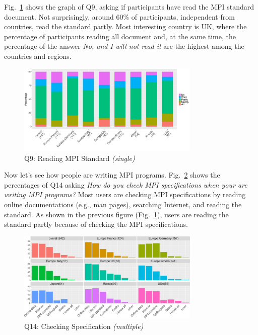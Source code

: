 \documentclass[preprint,5p,times]{elsarticle}
\def\myquote#1{{\it #1}}
\begin{document}
Fig.~\ref{fig:reading-standard} shows the graph of Q9, asking if
participants have read the MPI standard document. Not surprisingly,
around 60\% of participants, independent from countries, read the
standard partly. Most interesting country is UK, where the percentage
of participants reading all document and, at the same time, the
percentage of the answer \myquote{No, and I will not read it} are the
highest among the countries and regions.

\begin{figure}[htb]
\begin{center}
\includegraphics[width=8.7cm]{R-scripts/Q9.pdf}
\caption{Q9: Reading MPI Standard {\it(single)}}
\label{fig:reading-standard}
\end{center}
\end{figure}

Now let's see how people are writing MPI
programs. Fig.~\ref{fig:checking-spec} shows the percentages of Q14
asking \myquote{How do you check MPI specifications when your are writing MPI
programs?} Most users are checking MPI specifications by reading online
documentations (e.g., man pages), searching Internet, and reading the
standard. As shown in the previous figure
(Fig.~\ref{fig:reading-standard}), users are reading the standard
partly because of checking the MPI specifications.

\begin{figure}[htb]
\begin{center}
\includegraphics[width=8.7cm]{R-scripts/Q14.pdf}
\caption{Q14: Checking Specification {\it(multiple)}}
\label{fig:checking-spec}
\end{center}
\end{figure}
\end{document}
